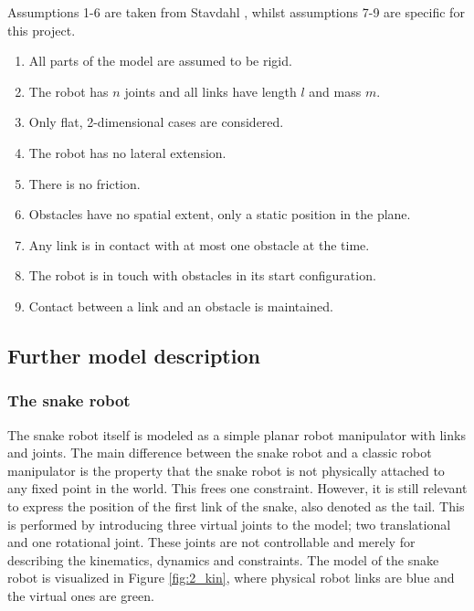 Assumptions 1-6 are taken from Stavdahl \cite{StavdahlNote}, whilst assumptions 7-9 are specific for this project.

\begin{enumerate}
    \item All parts of the model are assumed to be rigid.
    \item The robot has $n$ joints and all links have length $l$ and mass $m$.
    \item Only flat, 2-dimensional cases are considered.
    \item The robot has no lateral extension.
    \item There is no friction. 
    \item Obstacles have no spatial extent, only a static position in the plane.
    \item Any link is in contact with at most one obstacle at the time.
    \item The robot is in touch with obstacles in its start configuration.
    \item Contact between a link and an obstacle is maintained.
\end{enumerate}


\subsection{Further model description}

\subsubsection{The snake robot}
The snake robot itself is modeled as a simple planar robot manipulator with links and joints. The main difference between the snake robot and a classic robot manipulator is the property that the snake robot is not physically attached to any fixed point in the world. This frees one constraint. However, it is still relevant to express the position of the first link of the snake, also denoted as the tail. This is performed by introducing three virtual joints to the model; two translational and one rotational joint. These joints are not controllable and merely for describing the kinematics, dynamics and constraints. The model of the snake robot is visualized in Figure \ref{fig:2_kin}, where physical robot links are blue and the virtual ones are green.

